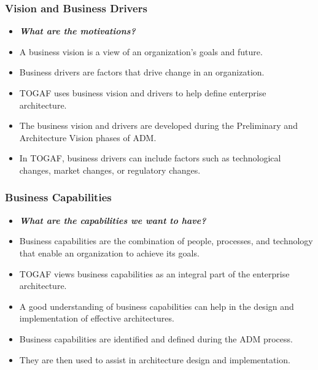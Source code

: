 \documentclass[aspectratio=169, table]{beamer}
\begin{document}
	\begin{frame}
		\frametitle{Vision and Business Drivers}
		\begin{itemize}
			\item \textbf{\textit{What are the motivations?}}
			\item A business vision is a view of an organization's goals and future.
			\item Business drivers are factors that drive change in an organization.
			\item TOGAF uses business vision and drivers to help define enterprise architecture.
			\item The business vision and drivers are developed during the Preliminary and Architecture Vision phases of ADM.
			\item In TOGAF, business drivers can include factors such as technological changes, market changes, or regulatory changes.
		\end{itemize}
	\end{frame}
	
	\begin{frame}
		\frametitle{Business Capabilities}
		\begin{itemize}
			\item \textbf{\textit{What are the capabilities we want to have?}}
			\item Business capabilities are the combination of people, processes, and technology that enable an organization to achieve its goals.
			\item TOGAF views business capabilities as an integral part of the enterprise architecture.
			\item A good understanding of business capabilities can help in the design and implementation of effective architectures.
			\item Business capabilities are identified and defined during the ADM process.
			\item They are then used to assist in architecture design and implementation.
		\end{itemize}
	\end{frame}
	
\end{document}
